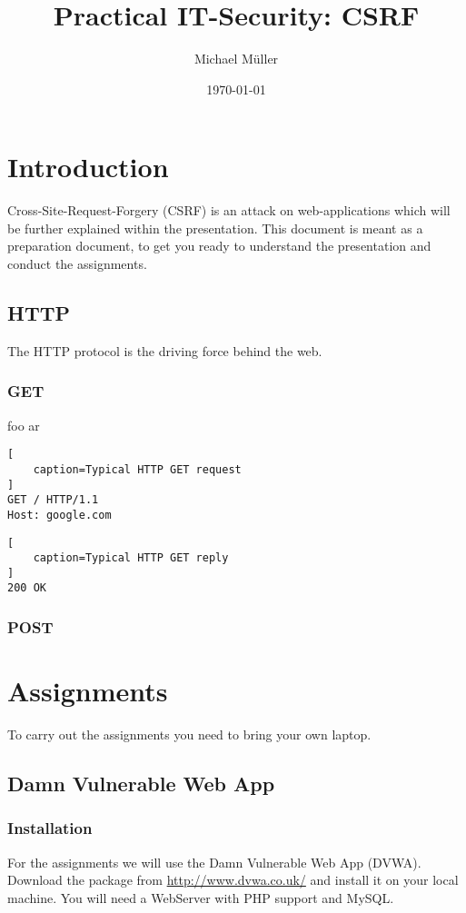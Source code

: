 \documentclass{report}
\title{Practical IT-Security: CSRF}
\author{Michael Müller}
\date{\today}
\begin{document}
\newpage

\maketitle

\newpage


\section{Introduction}

Cross-Site-Request-Forgery (\textsc{CSRF}) is an attack on web-applications
which will be further explained within the presentation.
This document is meant as a preparation document, to get you ready to
understand the presentation and conduct the assignments.

\subsection{HTTP}
The HTTP protocol is the driving force behind the web.

\subsubsection{GET}
foo ar



\begin{lstlisting}[
	caption=Typical HTTP GET request
]
GET / HTTP/1.1
Host: google.com
\end{lstlisting}

\begin{lstlisting}[
	caption=Typical HTTP GET reply
]
200 OK 
\end{lstlisting}

\subsubsection{POST}


\section{Assignments}

To carry out the assignments you need to bring your own laptop. 

\subsection{Damn Vulnerable Web App}
\subsubsection{Installation}
For the assignments we will use the Damn Vulnerable Web App (\textsc{DVWA}).
Download the package from \mbox{\url{http://www.dvwa.co.uk/}} and install it 
on your local machine. You will need a WebServer with PHP support and MySQL.
\end{document}

